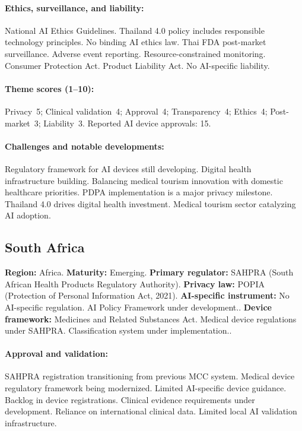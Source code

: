{\paragraph{Ethics, surveillance, and liability:}
National AI Ethics Guidelines. Thailand 4.0 policy includes responsible technology principles. No binding AI ethics law.
Thai FDA post-market surveillance. Adverse event reporting. Resource-constrained monitoring.
Consumer Protection Act. Product Liability Act. No AI-specific liability.

\paragraph{Theme scores (1--10):}
Privacy~5;
Clinical validation~4;
Approval~4;
Transparency~4;
Ethics~4;
Post-market~3;
Liability~3.
Reported AI device approvals: 15.

\paragraph{Challenges and notable developments:}
Regulatory framework for AI devices still developing. Digital health infrastructure building. Balancing medical tourism innovation with domestic healthcare priorities.
PDPA implementation is a major privacy milestone. Thailand 4.0 drives digital health investment. Medical tourism sector catalyzing AI adoption.


\subsection{South Africa}
\textbf{Region:} Africa.
\textbf{Maturity:} Emerging.
\textbf{Primary regulator:} SAHPRA (South African Health Products Regulatory Authority).
\textbf{Privacy law:} POPIA (Protection of Personal Information Act, 2021).
\textbf{AI-specific instrument:} No AI-specific regulation. AI Policy Framework under development..
\textbf{Device framework:} Medicines and Related Substances Act. Medical device regulations under SAHPRA. Classification system under implementation..

\paragraph{Approval and validation:}
SAHPRA registration transitioning from previous MCC system. Medical device regulatory framework being modernized. Limited AI-specific device guidance. Backlog in device registrations.
Clinical evidence requirements under development. Reliance on international clinical data. Limited local AI validation infrastructure.

}
